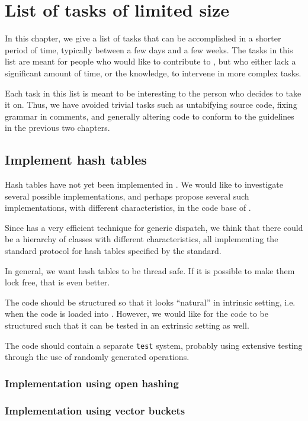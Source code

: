 \chapter{List of tasks of limited size}

In this chapter, we give a list of tasks that can be accomplished in a
shorter period of time, typically between a few days and a few weeks.
The tasks in this list are meant for people who would like to
contribute to \sysname{}, but who either lack a significant amount of
time, or the knowledge, to intervene in more complex tasks.

Each task in this list is meant to be interesting to the person who
decides to take it on.  Thus, we have avoided trivial tasks such as
untabifying source code, fixing grammar in comments, and generally
altering code to conform to the guidelines in the previous two
chapters.

\section{Implement hash tables}

Hash tables have not yet been implemented in \sysname{}.  We would
like to investigate several possible implementations, and perhaps
propose several such implementations, with different characteristics,
in the code base of \sysname{}.

Since \sysname{} has a very efficient technique for generic dispatch,
we think that there could be a hierarchy of classes with different
characteristics, all implementing the standard protocol for hash
tables specified by the \commonlisp{} standard.

In general, we want hash tables to be thread safe.  If it is possible
to make them lock free, that is even better.

The code should be structured so that it looks ``natural'' in
intrinsic setting, i.e. when the code is loaded into \sysname{}.
However, we would like for the code to be structured such that it can
be tested in an extrinsic setting as well.

The code should contain a separate \texttt{test} system, probably using
extensive testing through the use of randomly generated operations.

\subsection{Implementation using open hashing}

\subsection{Implementation using vector buckets}

